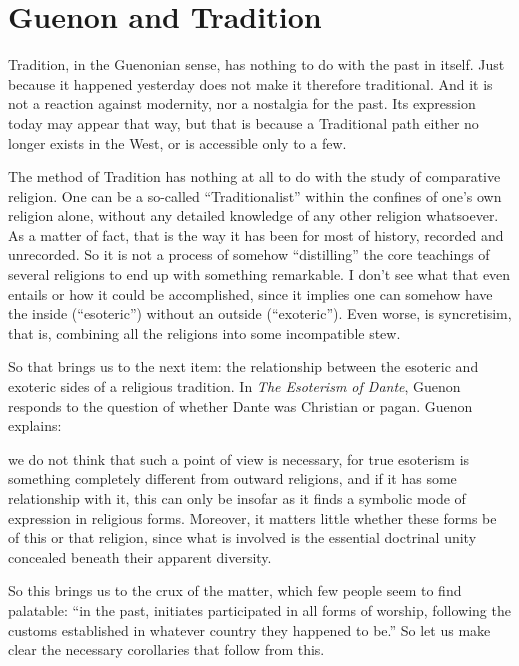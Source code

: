 \section{Guenon and Tradition}

Tradition, in the Guenonian sense, has nothing to do with the past in itself. Just because it happened yesterday does not make it therefore traditional. And it is not a reaction against modernity, nor a nostalgia for the past. Its expression today may appear that way, but that is because a Traditional path either no longer exists in the West, or is accessible only to a few.

The method of Tradition has nothing at all to do with the study of comparative religion. One can be a so-called ``Traditionalist'' within the confines of one's own religion alone, without any detailed knowledge of any other religion whatsoever. As a matter of fact, that is the way it has been for most of history, recorded and unrecorded. So it is not a process of somehow ``distilling'' the core teachings of several religions to end up with something remarkable. I don't see what that even entails or how it could be accomplished, since it implies one can somehow have the inside (``esoteric'') without an outside (``exoteric''). Even worse, is syncretisim, that is, combining all the religions into some incompatible stew.

So that brings us to the next item: the relationship between the esoteric and exoteric sides of a religious tradition. In \emph{The Esoterism of Dante}, Guenon responds to the question of whether Dante was Christian or pagan. Guenon explains:

\begin{quotex}
we do not think that such a point of view is necessary, for true esoterism is something completely different from outward religions, and if it has some relationship with it, this can only be insofar as it finds a symbolic mode of expression in religious forms. Moreover, it matters little whether these forms be of this or that religion, since what is involved is the essential doctrinal unity concealed beneath their apparent diversity.
\end{quotex}


So this brings us to the crux of the matter, which few people seem to find palatable: ``in the past, initiates participated in all forms of worship, following the customs established in whatever country they happened to be.'' So let us make clear the necessary corollaries that follow from this.


